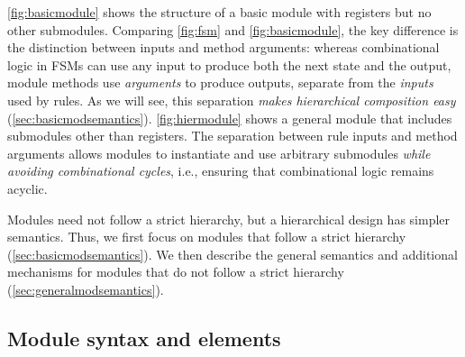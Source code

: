 \autoref{fig:basicmodule} shows the structure of a basic module with registers but no other submodules.
Comparing \autoref{fig:fsm} and \autoref{fig:basicmodule}, the key difference
is the distinction between inputs and method arguments: whereas combinational logic in FSMs
can use any input to produce both the next state and the output,
module methods use \emph{arguments} to produce outputs, separate from the \emph{inputs} used by rules.
As we will see, this separation \emph{makes hierarchical composition easy} (\autoref{sec:basicmodsemantics}).
\autoref{fig:hiermodule} shows a general module that includes submodules other than registers.
The separation between rule inputs and method arguments
allows modules to instantiate and use arbitrary submodules \emph{while avoiding combinational cycles},
i.e., ensuring that combinational logic remains acyclic.


Modules need not follow a strict hierarchy, but a hierarchical design has simpler semantics.
Thus, we first focus on modules that follow a strict hierarchy (\autoref{sec:basicmodsemantics}). %
We then describe the general semantics and additional mechanisms for modules that do not follow a strict hierarchy (\autoref{sec:generalmodsemantics}).

\subsection{Module syntax and elements}
\label{sec:modulesyntax}
\label{sec:submodules}

